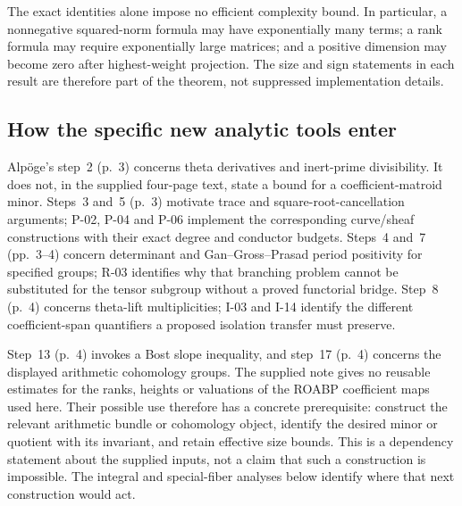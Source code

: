 The exact identities alone impose no efficient complexity bound. In particular, a nonnegative squared-norm formula may have exponentially many terms; a rank formula may require exponentially large matrices; and a positive dimension may become zero after highest-weight projection. The size and sign statements in each result are therefore part of the theorem, not suppressed implementation details.

\subsection{How the specific new analytic tools enter}

Alp\"oge's step~2 (p.~3) concerns theta derivatives and inert-prime divisibility. It does not, in the supplied four-page text, state a bound for a coefficient-matroid minor. Steps~3 and~5 (p.~3) motivate trace and square-root-cancellation arguments; P-02, P-04 and P-06 implement the corresponding curve/sheaf constructions with their exact degree and conductor budgets. Steps~4 and~7 (pp.~3--4) concern determinant and Gan--Gross--Prasad period positivity for specified groups; R-03 identifies why that branching problem cannot be substituted for the tensor subgroup without a proved functorial bridge. Step~8 (p.~4) concerns theta-lift multiplicities; I-03 and I-14 identify the different coefficient-span quantifiers a proposed isolation transfer must preserve.

Step~13 (p.~4) invokes a Bost slope inequality, and step~17 (p.~4) concerns the displayed arithmetic cohomology groups. The supplied note gives no reusable estimates for the ranks, heights or valuations of the ROABP coefficient maps used here. Their possible use therefore has a concrete prerequisite: construct the relevant arithmetic bundle or cohomology object, identify the desired minor or quotient with its invariant, and retain effective size bounds. This is a dependency statement about the supplied inputs, not a claim that such a construction is impossible. The integral and special-fiber analyses below identify where that next construction would act.
